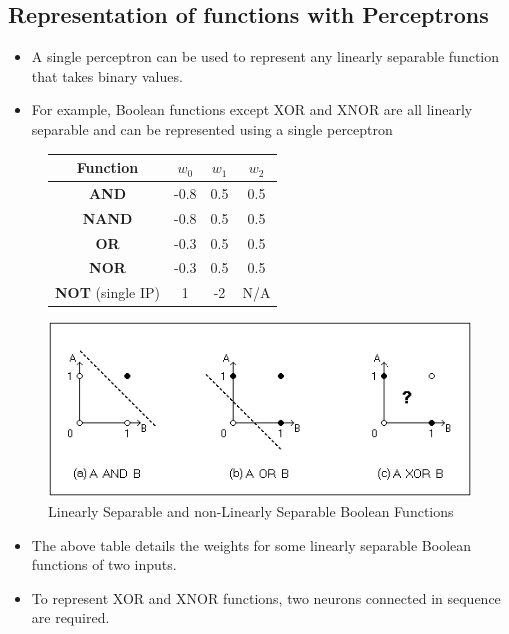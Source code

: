 \documentclass{article}
\theoremstyle{plain}
\theoremstyle{definition}
\begin{document}
\subsection{Representation of functions with Perceptrons}
\begin{itemize}
    \item A single perceptron can be used to represent any linearly separable function that takes binary values.
    
    \item For example, Boolean functions except XOR and XNOR are all linearly separable and can be represented using a single perceptron
\end{itemize}
\begin{figure}[!h]
    \centering
    \begin{tabular}{|c|c|c|c|}
        \hline
        \textbf{Function} & $w_0$ & $w_1$ & $w_2$ \\
        \hline
        \textbf{AND} & -0.8 & 0.5 & 0.5 \\
        \hline
        \textbf{NAND} & -0.8 & 0.5 & 0.5 \\
        \hline
        \textbf{OR} & -0.3 & 0.5 & 0.5 \\
        \hline
        \textbf{NOR} & -0.3 & 0.5 & 0.5 \\
        \hline
        \textbf{NOT} (single IP) & 1 & -2 & N/A \\
        \hline
    \end{tabular}
\end{figure}
\begin{figure}[!ht]
    \centering
    \includegraphics[scale = 0.8]{img.jpg}
    \caption{Linearly Separable and non-Linearly Separable Boolean Functions}
    \label{fig:my_label}
\end{figure}

\begin{itemize}
    \item The above table details the weights for some linearly separable Boolean functions of two inputs. 
    
    \item To represent XOR and XNOR functions, two neurons connected in sequence are required.
\end{itemize}
\end{document}
